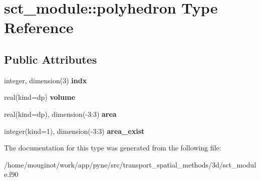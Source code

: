 \hypertarget{structsct__module_1_1polyhedron}{}\section{sct\+\_\+module\+:\+:polyhedron Type Reference}
\label{structsct__module_1_1polyhedron}
\subsection*{Public Attributes}
\begin{DoxyCompactItemize}
\item 
\mbox{\label{structsct__module_1_1polyhedron_a0a9f5f4cc18647a9ebeb2318bc83dfa7}} 
integer, dimension(3) {\bfseries indx}
\item 
\mbox{\label{structsct__module_1_1polyhedron_a20eae3d573880fd36935c35d3b1d6c75}} 
real(kind=dp) {\bfseries volume}
\item 
\mbox{\label{structsct__module_1_1polyhedron_aa39269bf2d196995f86f0b365b7c46dd}} 
real(kind=dp), dimension(-\/3\+:3) {\bfseries area}
\item 
\mbox{\label{structsct__module_1_1polyhedron_a4d8b6322e32640812e3c917645febc0b}} 
integer(kind=1), dimension(-\/3\+:3) {\bfseries area\+\_\+exist}
\end{DoxyCompactItemize}


The documentation for this type was generated from the following file\+:\begin{DoxyCompactItemize}
\item 
/home/mouginot/work/app/pyne/src/transport\+\_\+spatial\+\_\+methods/3d/sct\+\_\+module.\+f90\end{DoxyCompactItemize}
